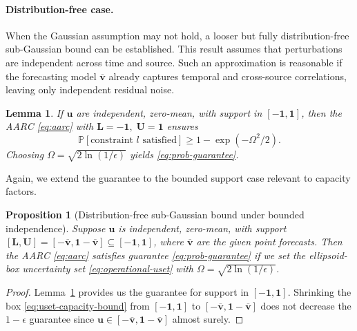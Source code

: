 \documentclass[11pt, letter]{article}
\newtheorem{proposition}[theorem]{Proposition}
\newtheorem{lemma}[theorem]{Lemma}
\begin{document}
\paragraph{Distribution-free case.}
When the Gaussian assumption may not hold, a looser but fully distribution-free sub-Gaussian bound can be established. 
This result assumes that perturbations are independent across time and source.
Such an approximation is reasonable if the forecasting model $\overline{\boldsymbol v}$ 
already captures temporal and cross-source correlations, leaving only independent residual noise.
\begin{lemma}\label{lemma:dist-free}
If $\boldsymbol{u}$ are independent, zero-mean, with support in $\boldsymbol{[-1,1]}$, then the AARC \eqref{eq:aarc} with $\boldsymbol{L} = \boldsymbol{-1},\; \boldsymbol{U} = \boldsymbol{1}$ ensures
\[\mathbb P[\text{constraint $l$ satisfied}]
\ge 1-\exp(-\Omega^2/2).\] Choosing $\Omega=\sqrt{2\ln(1/\epsilon)}$ yields 
\eqref{eq:prob-guarantee}.
\end{lemma}
Again, we extend the guarantee to the bounded support case relevant to capacity factors.
\begin{proposition}[Distribution-free sub-Gaussian bound under bounded independence]\label{prop:distfree}
Suppose $\boldsymbol{u}$ is independent, zero-mean, with support $\boldsymbol{[L,U] = [-\boldsymbol{\overline{v}},1-\boldsymbol{\overline{v}}]} \subseteq \boldsymbol{[-1,1]}$, where $\boldsymbol{\overline{v}}$ are the given point forecasts. Then the AARC \eqref{eq:aarc} satisfies guarantee \eqref{eq:prob-guarantee} if we set the ellipsoid-box uncertainty set \eqref{eq:operational-uset} with $\Omega=\sqrt{2\ln(1/\epsilon)}$.
\end{proposition}
\begin{proof}
Lemma~\ref{lemma:dist-free} provides us the guarantee for support in  $\boldsymbol{[-1,1]}$. Shrinking the box \eqref{eq:uset-capacity-bound} from $ \boldsymbol{[-1,1]}$ to $[-\boldsymbol{\overline{v}},\boldsymbol{1-\overline{v}}]$ does not decrease the  $1-\epsilon$ guarantee since  $\boldsymbol{u \in [-\boldsymbol{\overline{v}},1-\boldsymbol{\overline{v}}]}$ almost surely.
\end{proof}
\end{document}
